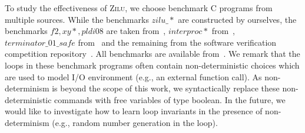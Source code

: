 To study the effectiveness of \textsc{Zilu}, we choose benchmark C programs from multiple sources.
While the benchmarks
 $\mathit{zilu\_*}$ are constructed by ourselves,
the benchmarks $\mathit{f2}, \mathit{xy*}, \mathit{pldi08}$ are taken from~\cite{gulwani2008program,sharma2012interpolants,gulavani2008automatically}, %
$\mathit{interproc*}$ from~\cite{jeannet2010interproc},
 $\mathit{terminator\_01\_safe}$ %
 from~\cite{beyer:SVCOMP:2013} and the remaining
from the software verification competition repository~\cite{Dirk:SVCOMP:2016}.  All benchmarks are available from~\cite{zilu:benchmark}.
We remark that the loops in these benchmark programs often contain non-deterministic choices
which are used to model I/O environment (e.g., an external function call).
As non-determinism is beyond the scope of this work, we syntactically replace these non-deterministic commands with free variables of type boolean. 
In the future, we would like to investigate how to learn loop invariants in the presence of non-determinism (e.g., random number generation in the loop).

